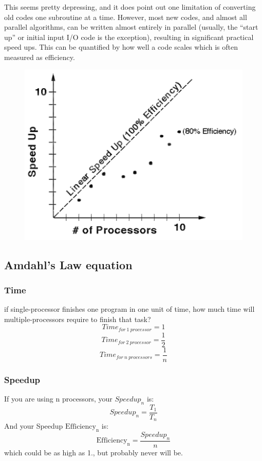 \documentclass[12pt, a4paper]{book}
\begin{document}

This seems pretty depressing, and it does point out one limitation of converting old
codes one subroutine at a time. However, most new codes, and almost all parallel
algorithms, can be written almost entirely in parallel (usually, the “start up” or
initial input I/O code is the exception), resulting in significant practical speed ups.
This can be quantified by how well a code scales which is often measured as
efficiency.
\begin{figure}[!h]
    \centering
    \includegraphics[width=0.5\linewidth]{figures/amdahl-law03.png}
\end{figure}
\subsection{Amdahl's Law equation}
\subsubsection{Time}
if single-processor finishes one program in one unit of time, how much time will multiple-processors require to finish that task?\\
\begin{equation}
    Time_{for\ 1\ processor} = 1
\end{equation}
\begin{equation}
    Time_{for\ 2\ processor} = \frac{1}{2}
\end{equation}
\begin{equation}
    Time_{for\ n\ processors} = \frac{1}{n}
\end{equation}
\subsubsection{Speedup}
If you are using n processors, your $Speedup_n$ is:
\begin{equation}
    Speedup_n = \frac{T_1}{T_n}
\end{equation}
And your Speedup $\mathrm{Efficiency_n}$ is:
\begin{equation}
    \mathrm{Efficiency_n} = \frac{Speedup_n}{n}
\end{equation}
which could be as high as 1., but probably never will be.
\end{document}
